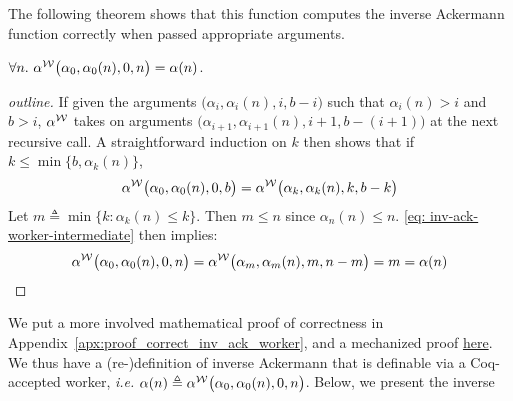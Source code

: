 The following theorem shows that this function computes the inverse Ackermann function correctly when passed appropriate arguments.
\begin{thm} \label{thm: inv-ack-worker-correct}
	\href{https://github.com/inv-ack/inv-ack/blob/7270e64a2600b771f2b1b1b151f7d13fb2ae6c97/inv_ack.v#L199-L231}{\coq}
	$\forall n.~\alpha^{\mathcal{W}}\big(\alpha_0, \alpha_0(n), 0, n\big) = \alpha(n)$.
\end{thm}
\begin{proof}[outline]
	If given the arguments $\big(\alpha_i, \alpha_i(n), i, b - i\big)$ such that $\alpha_i(n) > i$ and $b > i$, $\alpha^{\mathcal{W}}$ takes on arguments $\big(\alpha_{i+1}, \alpha_{i+1}(n), i+1, b - (i+1)\big)$ at the next recursive call. A straightforward induction on $k$ then shows that if $k\le \min\big\{b, \alpha_k(n)\big\}$,
	\begin{equation} \label{eq: inv-ack-worker-intermediate}
	\alpha^{\mathcal{W}}\big(\alpha_0, \alpha_0(n), 0, b\big) = \alpha^{\mathcal{W}}\big(\alpha_k, \alpha_k(n), k, b-k\big)
	\end{equation}
	Let $m \triangleq \min\big\{k : \alpha_k(n) \le k \}$. Then $m\le n$ since $\alpha_n(n)\le n$. \eqref{eq: inv-ack-worker-intermediate} then implies:
	$$ \alpha^{\mathcal{W}}\big(\alpha_0, \alpha_0(n), 0, n\big) = \alpha^{\mathcal{W}}\big(\alpha_m, \alpha_m(n), m, n - m\big) = m = \alpha(n) $$
\end{proof}
We put a more involved mathematical proof of correctness in Appendix~\ref{apx:proof_correct_inv_ack_worker}, and a mechanized proof
	\href{https://github.com/inv-ack/inv-ack/blob/7270e64a2600b771f2b1b1b151f7d13fb2ae6c97/inv_ack.v#L163-L231}{here}.
We thus have a (re-)definition of inverse Ackermann that is %
definable via a Coq-accepted worker, \emph{i.e.} $\alpha(n) \triangleq \alpha^{\mathcal{W}}\big(\alpha_0, \alpha_0(n), 0, n\big)$. Below, we present the inverse
